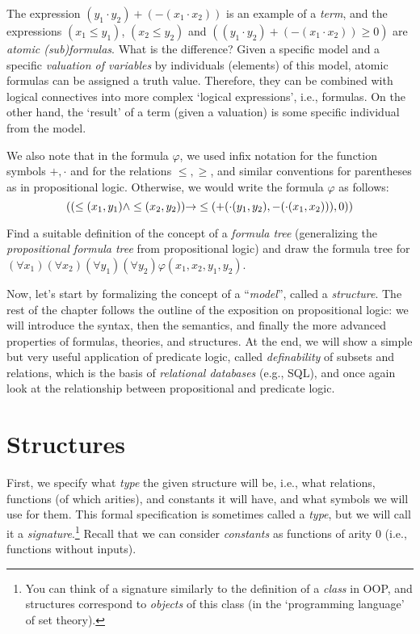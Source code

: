 The expression $(y_1 \cdot y_2)+(-(x_1\cdot x_2))$ is an example of a \emph{term}, and the expressions $(x_1\leq y_1)$, $(x_2\leq y_2)$ and $((y_1 \cdot y_2)+(-(x_1\cdot x_2))\geq 0)$ are \emph{atomic (sub)formulas}. What is the difference? Given a specific model and a specific \emph{valuation of variables} by individuals (elements) of this model, atomic formulas can be assigned a truth value. Therefore, they can be combined with logical connectives into more complex `logical expressions', i.e., formulas. On the other hand, the `result' of a term (given a valuation) is some specific individual from the model.

We also note that in the formula $\varphi$, we used infix notation for the function symbols $+,\cdot$ and for the relations $\leq,\geq$, and similar conventions for parentheses as in propositional logic. Otherwise, we would write the formula $\varphi$ as follows:
$$
((\leq (x_1,y_1) \land \leq(x_2,y_2))\mathbin{\rightarrow} \leq(+(\cdot (y_1,y_2),-(\cdot(x_1,x_2))),0))
$$

\begin{exercise}
Find a suitable definition of the concept of a \emph{formula tree} (generalizing the \emph{propositional formula tree} from propositional logic) and draw the formula tree for $(\forall x_1)(\forall x_2)(\forall y_1)(\forall y_2)\varphi(x_1,x_2,y_1,y_2)$.
\end{exercise}

Now, let's start by formalizing the concept of a ``\emph{model}'', called a \emph{structure}. The rest of the chapter follows the outline of the exposition on propositional logic: we will introduce the syntax, then the semantics, and finally the more advanced properties of formulas, theories, and structures. At the end, we will show a simple but very useful application of predicate logic, called \emph{definability} of subsets and relations, which is the basis of \emph{relational databases} (e.g., SQL), and once again look at the relationship between propositional and predicate logic.

\section{Structures}

First, we specify what \emph{type} the given structure will be, i.e., what relations, functions (of which arities), and constants it will have, and what symbols we will use for them. This formal specification is sometimes called a \emph{type}, but we will call it a \emph{signature}.\footnote{You can think of a signature similarly to the definition of a \emph{class} in OOP, and structures correspond to \emph{objects} of this class (in the `programming language' of set theory).} Recall that we can consider \emph{constants} as functions of arity 0 (i.e., functions without inputs).


